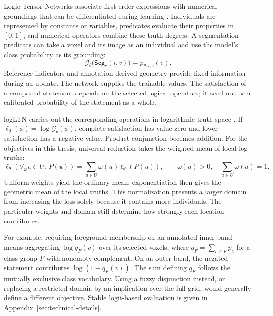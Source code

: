 \documentclass[12pt,a4paper]{article}
\begin{document}
Logic Tensor Networks associate first-order expressions with numerical
groundings that can be differentiated during learning
\cite{badreddine2022logic}. Individuals are represented by constants or
variables, predicates evaluate their properties in $[0,1]$, and numerical
operators combine these truth degrees. A segmentation predicate can take
a voxel and its image as an individual and use the model's class
probability as its grounding:
\begin{equation}
\mathcal{G}_{\theta}\bigl(\mathsf{Seg}_c(i,v)\bigr)
=p_{\theta,i,c}(v).
\label{eq:segmentation-predicate}
\end{equation}
Reference indicators and annotation-derived geometry provide fixed
information during an update. The network supplies the trainable values.
The satisfaction of a compound statement depends on the selected logical
operators; it need not be a calibrated probability of the statement as
a whole.

logLTN carries out the corresponding operations in logarithmic truth
space \cite{badreddine2023logltn}. If
$\ell_\theta(\phi)=\log\mathcal G_\theta(\phi)$, complete satisfaction
has value zero and lower satisfaction has a negative value. Product
conjunction becomes addition. For the objectives in this thesis,
universal reduction takes the weighted mean of local log-truths:
\begin{equation}
\ell_{\theta}(\forall_{\omega}u\in U:\,P(u))
=\sum_{u\in U}\omega(u)\ell_{\theta}(P(u)),
\qquad
\omega(u)>0,\quad\sum_{u\in U}\omega(u)=1.
\label{eq:weighted-log-universal}
\end{equation}
Uniform weights yield the ordinary mean; exponentiation then gives the
geometric mean of the local truths. This normalization prevents a larger
domain from increasing the loss solely because it contains more
individuals. The particular weights and domain still determine how
strongly each location contributes.

For example, requiring foreground membership on an annotated inner band
means aggregating $\log q_F(v)$ over its selected voxels, where
$q_F=\sum_{c\in F}p_c$ for a class group $F$ with nonempty complement.
On an outer band, the negated statement contributes $\log(1-q_F(v))$.
The sum defining $q_F$ follows the mutually exclusive class vocabulary.
Using a fuzzy disjunction instead, or replacing a restricted domain by
an implication over the full grid, would generally define a different
objective. Stable logit-based evaluation is given in
Appendix~\ref{sec:technical-details}.
\end{document}
